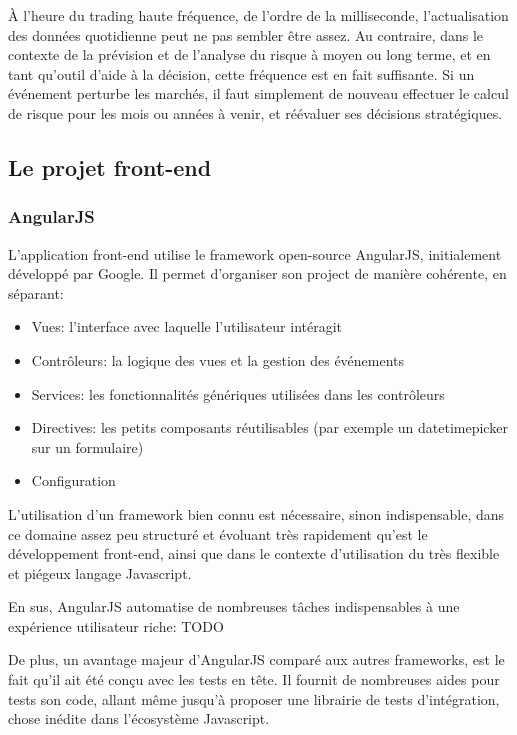 \documentclass[a4paper,french,12pt]{article}
\begin{document}
	\`A l'heure du trading haute fréquence, de l'ordre de la milliseconde, l'actualisation des données quotidienne peut ne pas sembler être assez. 
	Au contraire, dans le contexte de la prévision et de l'analyse du risque à moyen ou long terme, et en tant qu'outil d'aide à la décision, cette fréquence est en fait suffisante.
	 Si un événement perturbe les marchés, il faut simplement de nouveau effectuer le calcul de risque pour les mois ou années à venir, et réévaluer ses décisions stratégiques.

	
	\subsection{Le projet front-end}
		\subsubsection{AngularJS}

		L'application front-end utilise le framework open-source AngularJS, initialement développé par Google.
		Il permet d'organiser son project de manière cohérente, en séparant:
		
		\begin{itemize}
		\item Vues: l'interface avec laquelle l'utilisateur intéragit
		\item Contrôleurs: la logique des vues et la gestion des événements
		\item Services: les fonctionnalités génériques utilisées dans les contrôleurs
		\item Directives: les petits composants réutilisables (par exemple un datetimepicker sur un formulaire)
		\item Configuration
	\end{itemize}	
	
	L'utilisation d'un framework bien connu est nécessaire, sinon indispensable, dans ce domaine assez peu structuré et évoluant très rapidement qu'est le développement front-end, ainsi que dans le contexte d'utilisation du très flexible et piégeux langage Javascript.
	
	En sus, AngularJS automatise de nombreuses tâches indispensables à une expérience utilisateur riche: TODO
	
	De plus, un avantage majeur d'AngularJS comparé aux autres frameworks, est le fait qu'il ait été conçu avec les tests en tête. Il fournit de nombreuses aides pour tests son code, allant même jusqu'à proposer une librairie de tests d'intégration, chose inédite dans l'écosystème Javascript.
	
\end{document}

